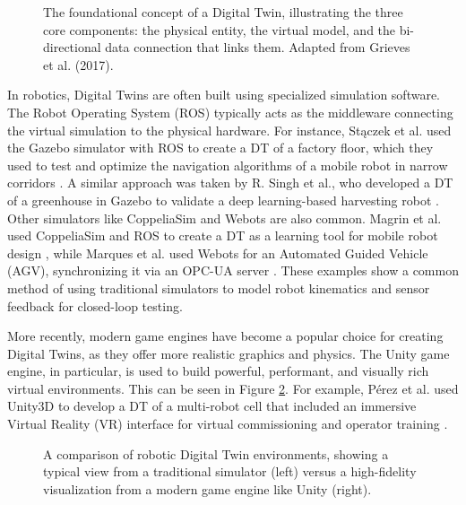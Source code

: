 \begin{figure}[h]
\centering
\caption{The foundational concept of a Digital Twin, illustrating the three core components: the physical entity, the virtual model, and the bi-directional data connection that links them. Adapted from Grieves et al. (2017).}
\label{fig:dt_concept}
\end{figure}

In robotics, Digital Twins are often built using specialized simulation software. The Robot Operating System (ROS) typically acts as the middleware connecting the virtual simulation to the physical hardware. For instance, Stączek et al. used the Gazebo simulator with ROS to create a DT of a factory floor, which they used to test and optimize the navigation algorithms of a mobile robot in narrow corridors \cite{Staczek2021}. A similar approach was taken by R. Singh et al., who developed a DT of a greenhouse in Gazebo to validate a deep learning-based harvesting robot \cite{Singh2024a}. Other simulators like CoppeliaSim and Webots are also common. Magrin et al. used CoppeliaSim and ROS to create a DT as a learning tool for mobile robot design \cite{Magrin2021}, while Marques et al. used Webots for an Automated Guided Vehicle (AGV), synchronizing it via an OPC-UA server \cite{Marques2024}. These examples show a common method of using traditional simulators to model robot kinematics and sensor feedback for closed-loop testing.

More recently, modern game engines have become a popular choice for creating Digital Twins, as they offer more realistic graphics and physics. The Unity game engine, in particular, is used to build powerful, performant, and visually rich virtual environments. This can be seen in Figure \ref{fig:dt_environments}. For example, Pérez et al. used Unity3D to develop a DT of a multi-robot cell that included an immersive Virtual Reality (VR) interface for virtual commissioning and operator training \cite{Perez2020}.

\begin{figure}[h]
\centering
\caption{A comparison of robotic Digital Twin environments, showing a typical view from a traditional simulator (left) versus a high-fidelity visualization from a modern game engine like Unity (right).}
\label{fig:dt_environments}
\end{figure}

